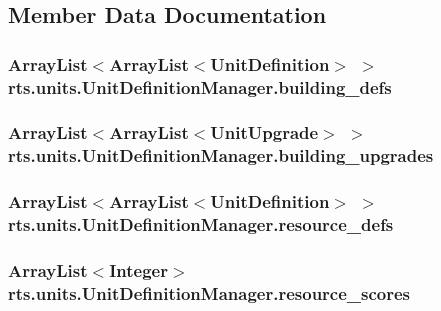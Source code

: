 \subsection{Member Data Documentation}
\hypertarget{classrts_1_1units_1_1_unit_definition_manager_ab890f3ed15ed6dda066d7d4906e76dff}{
\subsubsection[{building\_\-defs}]{\setlength{\rightskip}{0pt plus 5cm}ArrayList$<$ArrayList$<${\bf UnitDefinition}$>$ $>$ {\bf rts.units.UnitDefinitionManager.building\_\-defs}}}
\label{classrts_1_1units_1_1_unit_definition_manager_ab890f3ed15ed6dda066d7d4906e76dff}
\hypertarget{classrts_1_1units_1_1_unit_definition_manager_a77bfeba63104aa1bd861ed8d5831542e}{
\subsubsection[{building\_\-upgrades}]{\setlength{\rightskip}{0pt plus 5cm}ArrayList$<$ArrayList$<${\bf UnitUpgrade}$>$ $>$ {\bf rts.units.UnitDefinitionManager.building\_\-upgrades}}}
\label{classrts_1_1units_1_1_unit_definition_manager_a77bfeba63104aa1bd861ed8d5831542e}
\hypertarget{classrts_1_1units_1_1_unit_definition_manager_ac16af3c3a81068079d8208ad38a537cd}{
\subsubsection[{resource\_\-defs}]{\setlength{\rightskip}{0pt plus 5cm}ArrayList$<$ArrayList$<${\bf UnitDefinition}$>$ $>$ {\bf rts.units.UnitDefinitionManager.resource\_\-defs}}}
\label{classrts_1_1units_1_1_unit_definition_manager_ac16af3c3a81068079d8208ad38a537cd}
\hypertarget{classrts_1_1units_1_1_unit_definition_manager_ad7ce99e932a21a2cf931496173b9a67e}{
\subsubsection[{resource\_\-scores}]{\setlength{\rightskip}{0pt plus 5cm}ArrayList$<$Integer$>$ {\bf rts.units.UnitDefinitionManager.resource\_\-scores}}}
